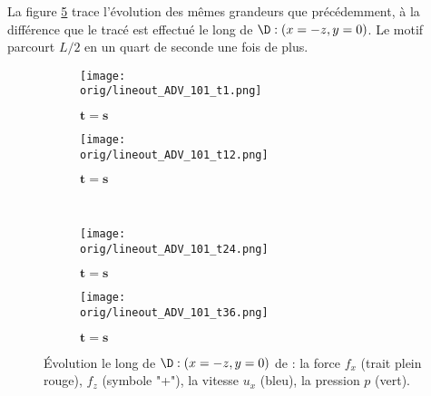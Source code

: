 La figure \ref{fig : 101} trace l'évolution des mêmes grandeurs que précédemment, à la différence que le tracé est effectué le long de $\D : (x=-z, y=0)$. Le motif parcourt $L/2$ en un quart de seconde une fois de plus. 



\begin{figure}
\begin{center}
	\begin{subfigure}[t]{0.4\textwidth}                                                                                                                                   
		\texttt{[image: \\orig/lineout\_ADV\_101\_t1.png]}
		\caption{ $\bm{t=s}$}
		\label{fig : 101_t1}
	\end{subfigure}\hfill
	\begin{subfigure}[t]{0.4\textwidth}
		\texttt{[image: \\orig/lineout\_ADV\_101\_t12.png]}
		\caption{ $\bm{t=s}$}
		\label{fig : 101_t6}
	\end{subfigure}
\\
	\begin{subfigure}[t]{0.4\textwidth}
		\texttt{[image: \\orig/lineout\_ADV\_101\_t24.png]}
		\caption{ $\bm{t=s}$}
		\label{fig : 101_t11}
	\end{subfigure}\hfill
	\begin{subfigure}[t]{0.4\textwidth}
		\texttt{[image: \\orig/lineout\_ADV\_101\_t36.png]}
		\caption{ $\bm{t=s}$}
		\label{fig : 101_t16}
	\end{subfigure}
\end{center}
\caption{Évolution le long de $\D : (x=-z, y=0)$ de : la force $f_x$ (trait plein rouge), $f_z$ (symbole "+"), la vitesse $u_x$ (bleu), la pression $p$ (vert).}
\label{fig : 101}
\end{figure}
